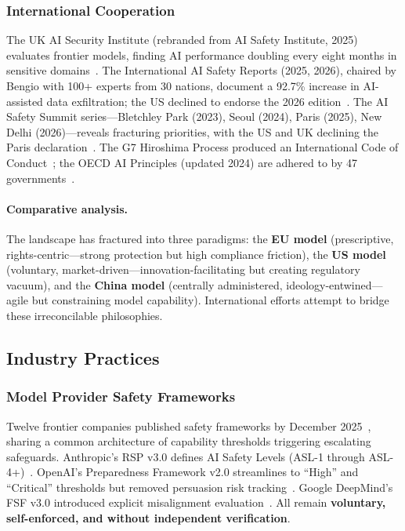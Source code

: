 \subsubsection{International Cooperation}
\label{sec:gov-intl}

The UK AI Security Institute (rebranded from AI Safety Institute, 2025) evaluates frontier models, finding AI performance doubling every eight months in sensitive domains~\cite{aisi2025trends}. The International AI Safety Reports (2025, 2026), chaired by Bengio with 100+ experts from 30 nations, document a 92.7\% increase in AI-assisted data exfiltration; the US declined to endorse the 2026 edition~\cite{aisafetyreport2025,aisafetyreport2026,time2026usretreat}. The AI Safety Summit series---Bletchley Park (2023), Seoul (2024), Paris (2025), New Delhi (2026)---reveals fracturing priorities, with the US and UK declining the Paris declaration~\cite{bletchley2023,seoul2024,paris2025}. The G7 Hiroshima Process produced an International Code of Conduct~\cite{hiroshima2023}; the OECD AI Principles (updated 2024) are adhered to by 47 governments~\cite{oecdai2024}.

\paragraph{Comparative analysis.}
The landscape has fractured into three paradigms: the \textbf{EU model} (prescriptive, rights-centric---strong protection but high compliance friction), the \textbf{US model} (voluntary, market-driven---innovation-facilitating but creating regulatory vacuum), and the \textbf{China model} (centrally administered, ideology-entwined---agile but constraining model capability). International efforts attempt to bridge these irreconcilable philosophies.


\subsection{Industry Practices}
\label{sec:gov-industry}

\subsubsection{Model Provider Safety Frameworks}
\label{sec:gov-frameworks}

Twelve frontier companies published safety frameworks by December 2025~\cite{metr2025frameworks}, sharing a common architecture of capability thresholds triggering escalating safeguards. Anthropic's RSP v3.0 defines AI Safety Levels (ASL-1 through ASL-4+)~\cite{anthropicrsp3}. OpenAI's Preparedness Framework v2.0 streamlines to ``High'' and ``Critical'' thresholds but removed persuasion risk tracking~\cite{openaiprepv2}. Google DeepMind's FSF v3.0 introduced explicit misalignment evaluation~\cite{googlefsf3}. All remain \textbf{voluntary, self-enforced, and without independent verification}.

